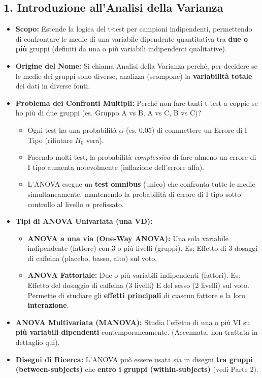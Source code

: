 \documentclass[12pt, a4paper]{article}
\newcommand{\alphaerr}{\alpha} %
\newcommand{\Hnull}{H_0} %
\begin{document}
\subsection*{1. Introduzione all'Analisi della Varianza}
\begin{itemize}
    \item \textbf{Scopo:} Estende la logica del t-test per campioni indipendenti, permettendo di confrontare le medie di una variabile dipendente quantitativa tra \textbf{due o più} gruppi (definiti da una o più variabili indipendenti qualitative).
    \item \textbf{Origine del Nome:} Si chiama Analisi della Varianza perché, per decidere se le medie dei gruppi sono diverse, analizza (scompone) la \textbf{variabilità totale} dei dati in diverse fonti.
    \item \textbf{Problema dei Confronti Multipli:} Perché non fare tanti t-test a coppie se ho più di due gruppi (es. Gruppo A vs B, A vs C, B vs C)?
        \begin{itemize}
            \item Ogni test ha una probabilità $\alphaerr$ (es. 0.05) di commettere un Errore di I Tipo (rifiutare $\Hnull$ vera).
            \item Facendo molti test, la probabilità \textit{complessiva} di fare almeno un errore di I tipo aumenta notevolmente (inflazione dell'errore alfa).
            \item L'ANOVA esegue un \textbf{test omnibus} (unico) che confronta tutte le medie simultaneamente, mantenendo la probabilità di errore di I tipo sotto controllo al livello $\alphaerr$ prefissato.
        \end{itemize}
    \item \textbf{Tipi di ANOVA Univariata (una VD):}
        \begin{itemize}
            \item \textbf{ANOVA a una via (One-Way ANOVA):} Una sola variabile indipendente (fattore) con 3 o più livelli (gruppi). Es: Effetto di 3 dosaggi di caffeina (placebo, basso, alto) sul voto.
            \item \textbf{ANOVA Fattoriale:} Due o più variabili indipendenti (fattori). Es: Effetto del dosaggio di caffeina (3 livelli) E del sesso (2 livelli) sul voto. Permette di studiare gli \textbf{effetti principali} di ciascun fattore e la loro \textbf{interazione}.
        \end{itemize}
    \item \textbf{ANOVA Multivariata (MANOVA):} Studia l'effetto di una o più VI su \textbf{più variabili dipendenti} contemporaneamente. (Accennata, non trattata in dettaglio qui).
    \item \textbf{Disegni di Ricerca:} L'ANOVA può essere usata sia in disegni \textbf{tra gruppi (between-subjects)} che \textbf{entro i gruppi (within-subjects)} (vedi Parte 2).
\end{itemize}
\end{document}
